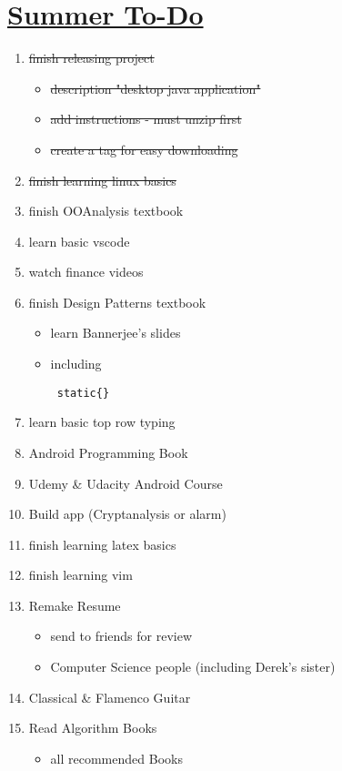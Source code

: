 \documentclass[10pt]{article}
\begin{document}
\section*{\underline{Summer To-Do}}

\begin{enumerate}
    \item \sout{finish releasing project}
    \begin{itemize}
	    \item \sout{description "desktop java application"}
	    \item \sout{add instructions - must unzip first}
        \item \sout{create a tag for easy downloading}
    \end{itemize}
    \item \sout{finish learning linux basics}
    \item finish OOAnalysis textbook
    \item learn basic vscode
    \item watch finance videos
    \item finish Design Patterns textbook
    \begin{itemize}
            \item learn Bannerjee's slides
            \item including \begin{verbatim} static{} \end{verbatim}
    \end{itemize}
    \item learn basic top row typing
    \item Android Programming Book
    \item Udemy \& Udacity Android Course
    \item Build app (Cryptanalysis or alarm)
    \item finish learning latex basics
    \item finish learning vim
    \item Remake Resume
    \begin{itemize}
        \item send to friends for review
        \item Computer Science people (including Derek's sister)
    \end{itemize}
    \item Classical \& Flamenco Guitar
    \item Read Algorithm Books
    \begin{itemize}
        \item all recommended Books
    \end{itemize}

\end{enumerate}
\end{document}
